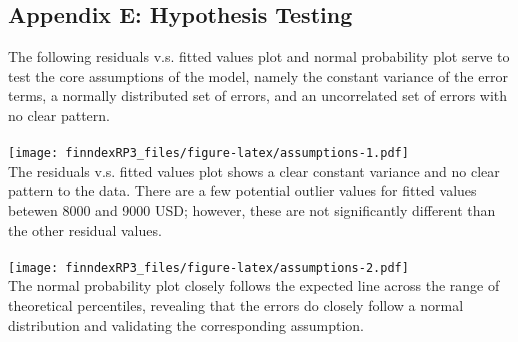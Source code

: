 \documentclass{article}
\begin{document}
\subsection{Appendix E: Hypothesis Testing}
The following residuals v.s. fitted values plot and normal probability plot serve to test the core assumptions of the model, namely the constant variance of the error terms, a normally distributed set of errors, and an uncorrelated set of errors with no clear pattern. \\~\\
\texttt{[image: finndexRP3\_files/figure-latex/assumptions-1.pdf]} \mbox{} \\
The residuals v.s. fitted values plot shows a clear constant variance and no clear pattern to the data. There are a few potential outlier values for fitted values betewen 8000 and 9000 USD; however, these are not significantly different than the other residual values. \\~\\
\texttt{[image: finndexRP3\_files/figure-latex/assumptions-2.pdf]} \mbox{} \\
The normal probability plot closely follows the expected line across the range of theoretical percentiles, revealing that the errors do closely follow a normal distribution and validating the corresponding assumption.
\end{document}
